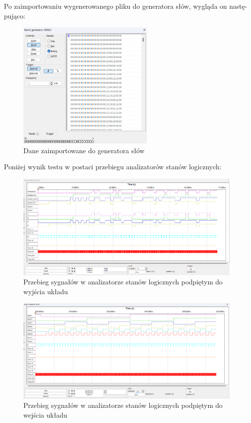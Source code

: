 \documentclass[a4paper]{article}
\begin{document}
Po zaimportowaniu wygenerowanego pliku do generatora słów, wygląda on nastę-
pująco:

\begin{figure}[H]
    \centering
    \includegraphics[width=0.6\textwidth]{direction_controller_test_word_generator.png}
    \caption{Dane zaimportowane do generatora słów}
\end{figure}

Poniżej wynik testu w postaci przebiegu analizatorów stanów logicznych:

\begin{figure}[H]
    \centering
    \includegraphics[width=\textwidth]{direction_controller_test_logic_analizer_xla1.png}
    \caption{Przebieg sygnałów w analizatorze stanów logicznych podpiętym do wyjścia układu}
\end{figure}

\begin{figure}[H]
    \centering
    \includegraphics[width=\textwidth]{direction_controller_test_logic_analizer_xla2.png}
    \caption{Przebieg sygnałów w analizatorze stanów logicznych podpiętym do wejścia układu}
\end{figure}
\end{document}
